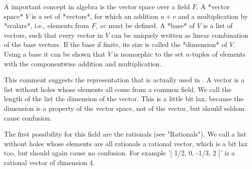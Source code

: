 %

A important concept in algebra  is the vector  space over a field $F$.  A
*vector space* $V$  is a set of *vectors*, for which an addition $u +  v$
and a multiplication by *scalars*, i.e., elements from $F$, $s v$ must be
defined.  A *base* of $V$ is a list of vectors, such that every vector in
$V$ can be uniquely written as  linear combination  of the  base vectors.
If the base if finite, its size is called  the *dimension* of $V$.  Using
a base it  can be  shown that $V$ is isomorphic to the set $n$-tuples  of
elements with the componentwise addition and multiplication.

This comment suggests the representation that is actually used in {\GAP}.
A {\GAP}  vector is a  list without holes  whose elements all come from a
common  field.   We call  the length   of the list  the dimension  of the
vector.  This is a little bit lax, because the dimension is a property of
the vector space, not of the vector, but should seldom cause confusion.

The first possibility for this field are the rationals (see "Rationals").
We call a list without holes whose elements  are all rationals a rational
vector, which is a bit lax too, but should  again  cause  no   confusion.
For example '[ 1/2, 0, -1/3, 2 ]' is a rational vector of dimension 4.

